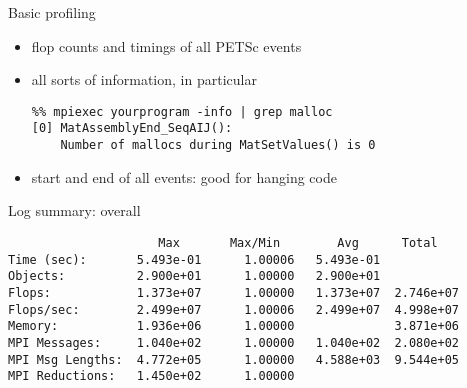 

\begin{numberedframe}{Basic profiling}

  \begin{itemize}
  \item {} flop counts and timings of all PETSc events
  \item {} all sorts of information, in particular
\begin{verbatim}
%% mpiexec yourprogram -info | grep malloc
[0] MatAssemblyEnd_SeqAIJ(): 
    Number of mallocs during MatSetValues() is 0
\end{verbatim}
  \item {} start and end of all events: good for hanging code
  \end{itemize}
\end{numberedframe}

\begin{numberedframe}{Log summary: overall}
\small
\begin{verbatim}
                     Max       Max/Min        Avg      Total 
Time (sec):       5.493e-01      1.00006   5.493e-01
Objects:          2.900e+01      1.00000   2.900e+01
Flops:            1.373e+07      1.00000   1.373e+07  2.746e+07
Flops/sec:        2.499e+07      1.00006   2.499e+07  4.998e+07
Memory:           1.936e+06      1.00000              3.871e+06
MPI Messages:     1.040e+02      1.00000   1.040e+02  2.080e+02
MPI Msg Lengths:  4.772e+05      1.00000   4.588e+03  9.544e+05
MPI Reductions:   1.450e+02      1.00000
\end{verbatim}
\end{numberedframe}

